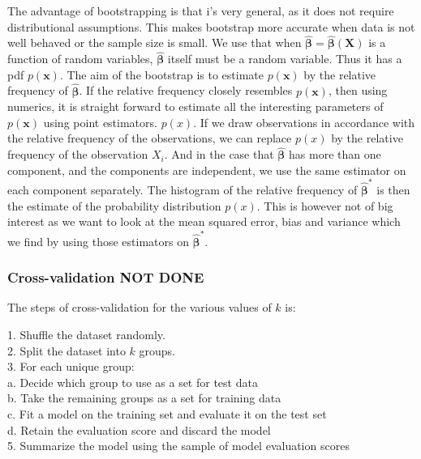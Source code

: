 The advantage of bootstrapping is that i's very general, as it does not require distributional assumptions. This makes bootstrap more accurate when data is not well behaved or the sample size is small. We use that when
 $\boldsymbol{\hat{\beta}}=\boldsymbol{\hat\beta}(\boldsymbol{X})$ is a function of random variables, $\boldsymbol{\hat\beta}$ itself must be a random variable. Thus it has
a pdf $p(\boldsymbol{x})$. The aim of the bootstrap is to
estimate $p(\boldsymbol{x})$ by the relative frequency of
$\boldsymbol{\hat\beta}$. If the relative frequency closely
resembles $p(\boldsymbol{x})$, then using numerics, it is straight forward to
estimate all the interesting parameters of $p(\boldsymbol{x})$ using point
estimators. $p(x)$. If we draw observations in accordance with
the relative frequency of the observations, we can replace $p(x)$ by the relative frequency of the observation $X_i$. And in the case that $\boldsymbol{\hat\beta}$ has
more than one component, and the components are independent, we use the
same estimator on each component separately. 
The histogram of the relative frequency of $\boldsymbol{\hat\beta}^*$ is then the estimate of the probability distribution $p(x)$. This is however not of big interest as we want to look at the mean squared error, bias and variance which we find by using those estimators on $\boldsymbol{\hat\beta}^*$.

\subsubsection{Cross-validation NOT DONE}
The steps of cross-validation for the various values of $k$ is:
\begin{mdframed}[backgroundcolor=black!10]
\raggedright

1. Shuffle the dataset randomly.\\

2. Split the dataset into $k$ groups.\\

3. For each unique group:\\

\hspace{1cm}a. Decide which group to use as a set for test data\\

\hspace{1cm}b. Take the remaining groups as a set for training data\\

\hspace{1cm}c. Fit a model on the training set and evaluate it on the test set\\

\hspace{1cm}d. Retain the evaluation score and discard the model\\

5. Summarize the model using the sample of model evaluation scores\\

\end{mdframed}

